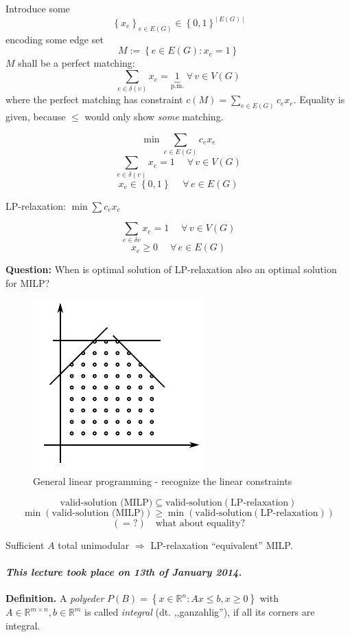 \documentclass[a4paper]{article}
\theoremstyle{definition}
\newcommand{\card}[1]{\left|\:\!#1\:\!\right|}
\newcommand{\set}[1]{\left\{#1\right\}}
\newcommand{\dateref}[1]{\paragraph{\textit{This lecture took place on #1.}}}
\newcommand{\fall}{\;\forall\,}
\begin{document}
Introduce some
\[ \left\{x_e\right\}_{e \in E(G)} \in \set{0,1}^{\card{E(G)}} \]
encoding some edge set
\[ M := \set{e \in E(G): x_e = 1} \]
$M$ shall be a perfect matching:
\[ \sum_{e \in \delta(v)} x_e = \underbrace{1}_{\text{p.m.}} \fall v \in V(G) \]
where the perfect matching has constraint $c(M) = \sum_{e \in E(G)} c_e x_e$.
Equality is given, because $\leq$ would only show \emph{some} matching.

\[
  \min \sum_{e \in E(G)} c_e x_e
\] \[
  \sum_{e \in \delta(v)} x_e = 1 \quad \fall v \in V(G)
\] \[
  x_e \in \set{0, 1} \quad \fall e \in E(G)
\]

LP-relaxation: $\min \sum c_e x_e$

\[
  \sum_{e \in \delta{v}} x_e = 1 \quad \fall v \in V(G)
\] \[
  x_e \geq 0 \quad \fall e \in E(G)
\]

\textbf{Question:} When is optimal solution of LP-relaxation also an optimal solution for MILP?

\begin{figure}
  \begin{center}
    \includegraphics{img/linear_programming.pdf}
    \caption{General linear programming - recognize the linear constraints}
  \end{center}
\end{figure}

\[
  \text{valid-solution (MILP)} \subseteq \text{valid-solution}(\text{LP-relaxation})
\] \[
  \min(\text{valid-solution (MILP)}) \geq \min(\text{valid-solution}(\text{LP-relaxation}))
\] \[
  (= ?)  \quad \text{what about equality?}
\]

Sufficient $A$ total unimodular $\Rightarrow$ LP-relaxation ``equivalent'' MILP.


\dateref{13th of January 2014}

\textbf{Definition.}
  A \emph{polyeder} $P(B) = \set{x \in \mathbb{R}^n: Ax \leq b, x \geq 0}$ with $A \in \mathbb{R}^{m\times n}, b \in \mathbb{R}^m$ is called \emph{integral} (dt. ,,ganzahlig''), if all its corners are integral.
\end{document}
